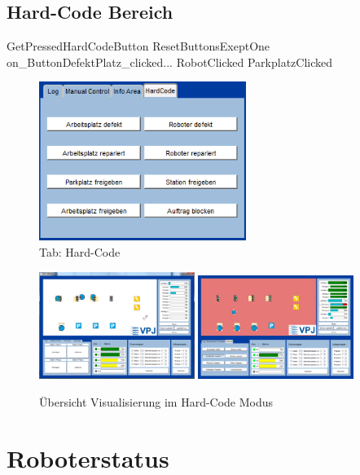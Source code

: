 \subsection{Hard-Code Bereich}
\label{sec:HardCode}
GetPressedHardCodeButton
ResetButtonsExeptOne
on_ButtonDefektPlatz_clicked...
RobotClicked
ParkplatzClicked

\begin{figure}[htb]
    \centering
    \includegraphics[width=0.6\textwidth]{Abbildungen/HardCode.png}
    \caption{Tab: Hard-Code}		
    \label{fig:HardCode}
\end{figure}

\begin{figure}[htb]
    \centering
    \includegraphics[width=0.45\textwidth]{Abbildungen/Gesamtprogramm.png}
    \includegraphics[width=0.45\textwidth]{Abbildungen/GesamtprogrammROT.png}
    \caption{Übersicht Visualisierung im Hard-Code Modus}		
    \label{fig:GesamtprogrammROT}
\end{figure}

\section{Roboterstatus}

